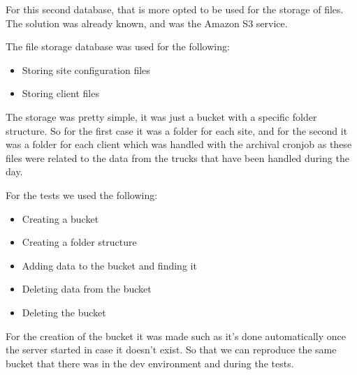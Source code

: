 For this second database, that is more opted to be used for the storage of files.
The solution was already known, and was the Amazon S3 service.

The file storage database was used for the following:

    \begin{itemize}
        \item Storing site configuration files
        \item Storing client files
    \end{itemize}

The storage was pretty simple, it was just a bucket with a specific folder structure.
So for the first case it was a folder for each site,
and for the second it was a folder for each client which was handled with the archival
cronjob as these files were related to the data from the trucks that have been handled
during the day.

For the tests we used the following:

    \begin{itemize}
        \item Creating a bucket
        \item Creating a folder structure
        \item Adding data to the bucket and finding it
        \item Deleting data from the bucket
        \item Deleting the bucket
    \end{itemize}

For the creation of the bucket it was made such as it's done automatically once the
server started in case it doesn't exist.
So that we can reproduce the same bucket that there was in the dev environment and during
the  tests.
